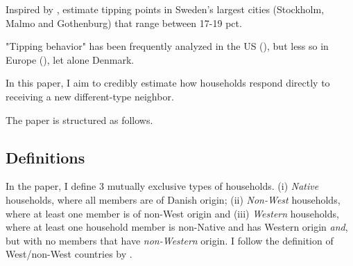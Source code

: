 \documentclass[../main.tex]{subfiles}
\begin{document}
Inspired by \textcite{card2008tipping}, \textcite{bohlmark_willen_2020_tipping} estimate tipping points in Sweden's largest cities (Stockholm, Malmo and Gothenburg) that range between 17-19 pct. 


"Tipping behavior" has been frequently analyzed in the US (\textcite{Ananat_2011, davis2018long, chetty2015impacts}), but less so in Europe (\textcite{bohlmark_willen_2020_tipping}), let alone Denmark. 

In this paper, I aim to credibly estimate how households respond directly to receiving a new different-type neighbor.


The paper is structured as follows. 

\subsection{Definitions}
\label{sec:intro_definitions}
In the paper, I define 3 mutually exclusive types of households. (i) \textit{Native} households, where all members are of Danish origin; (ii) \textit{Non-West} households, where at least one member is of non-West origin and (iii) \textit{Western} households, where at least one household member is non-Native and has Western origin \textit{and}, but with no members that have \textit{non-Western} origin. I follow the definition of West/non-West countries by \textcite{west_non_west_def_dst}.
\end{document}
